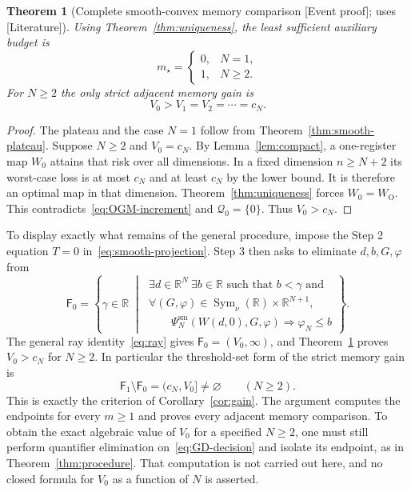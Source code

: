 \documentclass[11pt]{article}
\newcommand{\supportlabel}[1]{\textcolor{blue!60!black}{\small\textsf{[#1]}}}
\newcommand{\eventproof}{\supportlabel{Event proof}}
\newcommand{\literature}{\supportlabel{Literature}}
\numberwithin{equation}{section}
\newtheorem{theorem}{Theorem}[section]
\theoremstyle{definition}
\newcommand{\R}{\mathbb R}
\newcommand{\Q}{\mathcal Q}
\DeclareMathOperator{\Sym}{Sym}
\begin{document}
\begin{samepage}
\begin{theorem}[Complete smooth-convex memory comparison \eventproof; uses \literature]\label{thm:smooth-memory}
Using Theorem~\ref{thm:uniqueness}, the least sufficient auxiliary budget is
\begin{equation}
 m_\star=
 \begin{cases}
 0,&N=1,\\
 1,&N\ge2.
 \end{cases}
 \label{eq:smooth-minmemory}
\end{equation}
For $N\ge2$ the only strict adjacent memory gain is
\begin{equation}
 V_0>V_1=V_2=\cdots=c_N.
 \label{eq:smooth-gap}
\end{equation}
\end{theorem}
\end{samepage}
\begin{proof}
The plateau and the case $N=1$ follow from Theorem~\ref{thm:smooth-plateau}. Suppose $N\ge2$ and $V_0=c_N$. By Lemma~\ref{lem:compact}, a one-register map $W_0$ attains that risk over all dimensions. In a fixed dimension $n\ge N+2$ its worst-case loss is at most $c_N$ and at least $c_N$ by the lower bound. It is therefore an optimal map in that dimension. Theorem~\ref{thm:uniqueness} forces $W_0=W_{\mathrm O}$. This contradicts~\eqref{eq:OGM-increment} and $\Q_0=\{0\}$. Thus $V_0>c_N$.
\end{proof}

To display exactly what remains of the general procedure, impose the Step 2 equation $T=0$ in~\eqref{eq:smooth-projection}. Step 3 then asks to eliminate $d,b,G,\varphi$ from
\begin{equation}
 \mathsf F_0=\left\{\gamma\in\R\;\middle|\;
 \begin{array}{l}
 \exists d\in\R^N\ \exists b\in\R\text{ such that }b<\gamma\text{ and}\\[2pt]
 \forall(G,\varphi)\in\Sym_\nu(\R)\times\R^{N+1},\\[2pt]
 \qquad\Psi_N^{\mathrm{sm}}(W(d,0),G,\varphi)\Rightarrow\varphi_N\le b
 \end{array}
 \right\}.
 \label{eq:GD-decision}
\end{equation}
The general ray identity~\eqref{eq:ray} gives $\mathsf F_0=(V_0,\infty)$, and Theorem~\ref{thm:smooth-memory} proves $V_0>c_N$ for $N\ge2$. In particular the threshold-set form of the strict memory gain is
\begin{equation}
 \mathsf F_1\setminus\mathsf F_0=(c_N,V_0]\ne\varnothing
 \qquad(N\ge2).
 \label{eq:smooth-threshold-gap}
\end{equation}
This is exactly the criterion of Corollary~\ref{cor:gain}. The argument computes the endpoints for every $m\ge1$ and proves every adjacent memory comparison. To obtain the exact algebraic value of $V_0$ for a specified $N\ge2$, one must still perform quantifier elimination on~\eqref{eq:GD-decision} and isolate its endpoint, as in Theorem~\ref{thm:procedure}. That computation is not carried out here, and no closed formula for $V_0$ as a function of $N$ is asserted.
\end{document}
